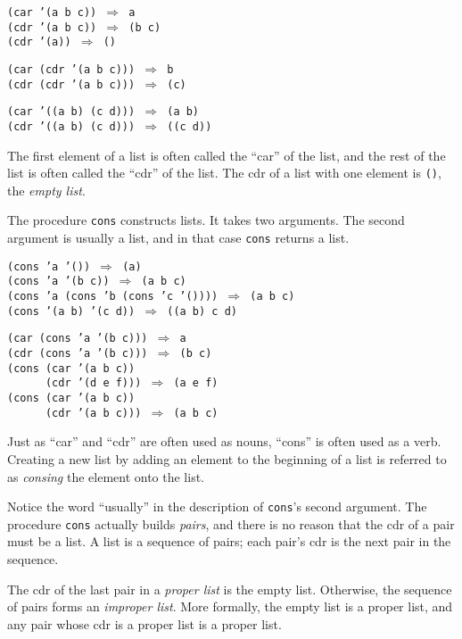 \begin{alltt}
(car '(a b c)) \(\Rightarrow\) a
(cdr '(a b c)) \(\Rightarrow\) (b c)
(cdr '(a)) \(\Rightarrow\) ()

(car (cdr '(a b c))) \(\Rightarrow\) b
(cdr (cdr '(a b c))) \(\Rightarrow\) (c)

(car '((a b) (c d))) \(\Rightarrow\) (a b)
(cdr '((a b) (c d))) \(\Rightarrow\) ((c d))
\end{alltt}


The first element of a list is often called the ``car'' of the
list, and the rest of the list is often called the ``cdr'' of
the list.
The cdr of a list with one element is \label{start_s23}\texttt{()}, the \label{start_s24}\textit{empty list}.


The procedure \label{start_s25}\texttt{cons} constructs lists.
It takes two arguments.
The second argument is usually a list, and in that case \texttt{cons}
returns a list.


\begin{alltt}
(cons 'a '()) \(\Rightarrow\) (a)
(cons 'a '(b c)) \(\Rightarrow\) (a b c)
(cons 'a (cons 'b (cons 'c '()))) \(\Rightarrow\) (a b c)
(cons '(a b) '(c d)) \(\Rightarrow\) ((a b) c d)

(car (cons 'a '(b c))) \(\Rightarrow\) a
(cdr (cons 'a '(b c))) \(\Rightarrow\) (b c)
(cons (car '(a b c))
      (cdr '(d e f))) \(\Rightarrow\) (a e f)
(cons (car '(a b c))
      (cdr '(a b c))) \(\Rightarrow\) (a b c)
\end{alltt}


Just as ``car'' and ``cdr'' are often used as nouns, ``cons'' is
often used as a verb.
Creating a new list by adding an element to the beginning of a list
is referred to as \label{start_s26}\textit{consing} the element onto the list.


Notice the word ``usually'' in the description of \texttt{cons}'s second
argument.
The procedure \texttt{cons} actually builds \label{start_s27}\textit{pairs}, and there is no
reason that the cdr of a pair must be a list.
A list is a sequence of pairs; each pair's cdr is the next pair in
the sequence.
\begin{figure}[H]
\centering

\end{figure}

The cdr of the last pair in a \label{start_s28}\textit{proper list} is the empty list.
Otherwise, the sequence of pairs forms an \label{start_s29}\textit{improper list}.
More formally, the empty list is a proper list, and any pair whose cdr
is a proper list is a proper list.

